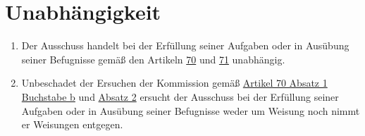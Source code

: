 \chapter{Unabhängigkeit}
\label{ch:69}


\begin{enumerate}

  \item Der Ausschuss handelt bei der Erfüllung seiner Aufgaben oder in Ausübung seiner Befugnisse gemäß den Artikeln
   \hyperref[ch:70]{70} und \hyperref[ch:71]{71} unabhängig.
  \label{itm:69-1}

  \item Unbeschadet der Ersuchen der Kommission gemäß \hyperref[itm:70-1b]{Artikel 70 Absatz 1 Buchstabe b} und
  \hyperref[itm:70-2]{Absatz 2} ersucht der Ausschuss bei der Erfüllung seiner Aufgaben oder in Ausübung seiner
   Befugnisse weder um Weisung noch nimmt er Weisungen entgegen.
  \label{itm:69-2}

\end{enumerate}


